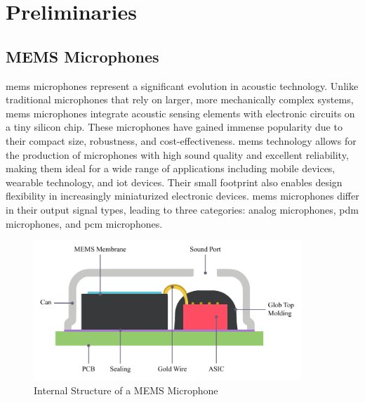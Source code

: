 \chapter{Preliminaries}
\section{MEMS Microphones}
\label{sec:mems_microphones}
\acrfull{mems} microphones represent a significant evolution in acoustic technology.
Unlike traditional microphones that rely on larger, more mechanically complex systems,
\acrshort{mems} microphones integrate acoustic sensing elements with electronic circuits on a tiny silicon chip.
These microphones have gained immense popularity due to their compact size, robustness, and cost-effectiveness.
\acrshort{mems} technology allows for the production of microphones with high sound quality and excellent reliability,
making them ideal for a wide range of applications including mobile devices, wearable technology, and \acrshort{iot} devices.
Their small footprint also enables design flexibility in increasingly miniaturized electronic devices.
\acrshort{mems} microphones differ in their output signal types, leading to three categories: analog microphones, \acrshort{pdm} microphones, and \acrshort{pcm} microphones.
\begin{figure}[h]
	\centering
	\includegraphics[width=0.9\textwidth]{images/2_preliminaries/mems_microphone_illustration.pdf}
	\caption{Internal Structure of a MEMS Microphone \cite{mems_microphone_construction}}
	\label{fig:mems_microphone}
\end{figure}


